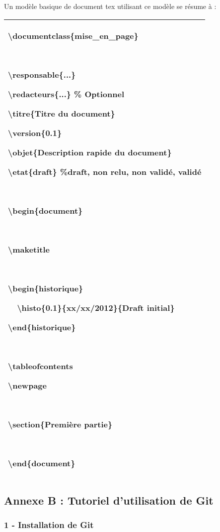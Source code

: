 \documentclass{article}
\begin{document}
\bigskip

Un modèle basique de document tex utilisant ce modèle se résume à :

\begin{flushleft}
\tablehead{}
\begin{supertabular}{|m{16.345cm}|}
\hline
{\textbackslash}documentclass\{mise\_en\_page\}

~

{\textbackslash}responsable\{...\}

{\textbackslash}redacteurs\{...\} \% Optionnel

{\textbackslash}titre\{Titre du document\}

{\textbackslash}version\{0.1\}

{\textbackslash}objet\{Description rapide du document\}

{\textbackslash}etat\{draft\} \%draft, non relu, non validé, validé

~

{\textbackslash}begin\{document\}

~

{\textbackslash}maketitle

~

{\textbackslash}begin\{historique\}

\ \ {\textbackslash}histo\{0.1\}\{xx/xx/2012\}\{Draft initial\}

{\textbackslash}end\{historique\}

~

{\textbackslash}tableofcontents

{\textbackslash}newpage

~

{\textbackslash}section\{Première partie\}

~

{\textbackslash}end\{document\}\\\hline
\end{supertabular}
\end{flushleft}

\bigskip

\subsection[Annexe B : Tutoriel d’utilisation de Git]{Annexe B :
Tutoriel d’utilisation de Git}

\bigskip

\subsubsection[1 {}- Installation de Git]{1 - Installation de Git}
\end{document}
